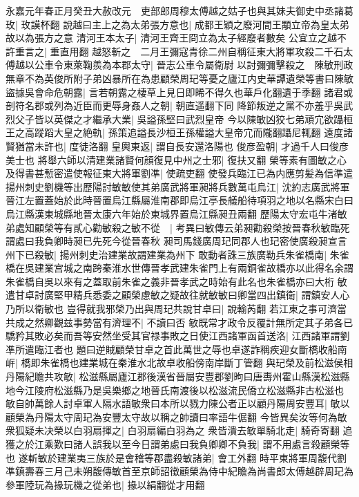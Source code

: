 永嘉元年春正月癸丑大赦改元　吏部郎周穆太傅越之姑子也與其妹夫御史中丞諸葛玫|{
	玫謨杯翻}
說越曰主上之為太弟張方意也|{
	成都王穎之廢河間王顒立帝為皇太弟故以為張方之意}
清河王本太子|{
	清河王齊王冏立為太子經廢者數矣}
公宜立之越不許重言之|{
	重直用翻}
越怒斬之　二月王彌寇青徐二州自稱征東大將軍攻殺二千石太傅越以公車令東萊鞠羨為本郡太守|{
	晉志公車令屬衛尉}
以討彌彌擊殺之　陳敏刑政無章不為英俊所附子弟凶暴所在為患顧榮周玘等憂之廬江内史華譚遺榮等書曰陳敏盜據吳會命危朝露|{
	言若朝露之棲草上見日即晞不得久也華戶化翻遺于季翻}
諸君或剖符名郡或列為近臣而更辱身姦人之朝|{
	朝直遥翻下同}
降節叛逆之黨不亦羞乎吳武烈父子皆以英傑之才繼承大業|{
	吳謚孫堅曰武烈皇帝}
今以陳敏凶狡七弟頑宂欲躡桓王之高蹤蹈大皇之絶軌|{
	孫策追謚長沙桓王孫權謚大皇帝宂而隴翻躡尼輒翻}
遠度諸賢猶當未許也|{
	度徒洛翻}
皇輿東返|{
	謂自長安還洛陽也}
俊彦盈朝|{
	才過千人曰俊彦美士也}
將舉六師以清建業諸賢何顔復見中州之士邪|{
	復扶又翻}
榮等素有圖敏之心及得書甚慙密遣使報征東大將軍劉凖|{
	使疏吏翻}
使發兵臨江已為内應剪髪為信準遣揚州刺史劉機等出歷陽討敏敏使其弟廣武將軍昶將兵數萬屯烏江|{
	沈約志廣武將軍晉江左置蓋始於此時晉置烏江縣屬淮南郡即烏江亭長艤船待項羽之地以名縣宋白曰烏江縣漢東城縣地晉太康六年始於東城界置烏江縣昶丑兩翻}
歷陽太守宏屯牛渚敏弟處知顧榮等有貳心勸敏殺之敏不從　|{
	考異曰敏傳云弟昶勸殺榮按晉春秋敏臨死謂處曰我負卿時昶已先死今從晉春秋}
昶司馬錢廣周玘同郡人也玘密使廣殺昶宣言州下已殺敏|{
	揚州刺史治建業故謂建業為州下}
敢動者誅三族廣勒兵朱雀橋南|{
	朱雀橋在吳建業宫城之南跨秦淮水世傳晉孝武建朱雀門上有兩銅雀故橋亦以此得名余謂朱雀橋自吳以來有之蓋取前朱雀之義非晉孝武之時始有此名也朱雀橋亦曰大桁}
敏遣甘卓討廣堅甲精兵悉委之顧榮慮敏之疑故往就敏敏曰卿當四出鎮衛|{
	謂鎮安人心乃所以衛敏也}
豈得就我邪榮乃出與周玘共說甘卓曰|{
	說輸芮翻}
若江東之事可濟當共成之然卿觀兹事勢當有濟理不|{
	不讀曰否}
敏既常才政令反覆計無所定其子弟各已驕矜其敗必矣而吾等安然坐受其官禄事敗之日使江西諸軍函首送洛|{
	江西諸軍謂劉凖所遣臨江者也}
題曰逆賊顧榮甘卓之首此萬世之辱也卓遂詐稱疾迎女斷橋收船南㟁|{
	橋即朱雀橋也建業城在秦淮水北故卓收船傍南岸斷丁管翻}
與玘榮及前松滋侯相丹陽紀瞻共攻敏|{
	松滋縣屬廬江郡後漢省晉屬安豐郡劉昫曰唐夀州霍山縣漢松滋縣地今江陵府松滋縣乃是吳樂鄉之地晉氏南渡後以松滋流民僑立松滋縣非古松滋也}
敏自帥萬餘人討卓軍人隔水語敏衆曰本所以戮力陳公者正以顧丹陽周安豐耳|{
	敏以顧榮為丹陽太守周玘為安豐太守故以稱之帥讀曰率語牛倨翻}
今皆異矣汝等何為敏衆狐疑未决榮以白羽扇揮之|{
	白羽扇編白羽為之}
衆皆潰去敏單騎北走|{
	騎奇寄翻}
追獲之於江乘歎曰諸人誤我以至今日謂弟處曰我負卿卿不負我|{
	謂不用處言殺顧榮等也}
遂斬敏於建業夷三族於是會稽等郡盡殺敏諸弟|{
	會工外翻}
時平東將軍周馥代劉凖鎮壽春三月己未朔馥傳敏首至京師詔徵顧榮為侍中紀瞻為尚書郎太傅越辟周玘為參軍陸玩為掾玩機之從弟也|{
	掾以絹翻從才用翻}
